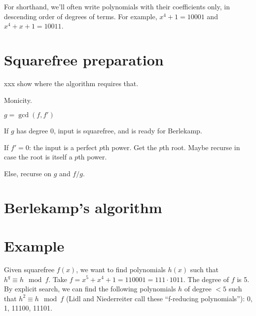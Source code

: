 \documentclass[10pt]{article}
\numberwithin{equation}{subsection}
\begin{document}
For shorthand, we'll often write polynomials with their coefficients only, in
descending order of degrees of terms.  For example, $x^4+1 = 10001$ and
$x^4+x+1=10011$.


\newpage
\section{Squarefree preparation}

xxx show where the algorithm requires that.

Monicity.

$g = \gcd(f,f')$

If $g$ has degree 0, input is squarefree, and is ready for Berlekamp.

If $f' = 0$:  the input is a perfect $p$th power.  Get the $p$th root.
Maybe recurse in case the root is itself a $p$th power.

Else, recurse on $g$ and $f/g$.

\newpage
\section{Berlekamp's algorithm}

\newpage
\section{Example}

Given squarefree $f(x)$, we want to find polynomials $h(x)$
such that $h^q \equiv h \mod f$.  Take $f = x^5+x^4+1 =
110001 = 111 \cdot 1011$.  The degree of $f$ is 5.  By
explicit search, we can find the following polynomials $h$
of degree $< 5$ such that $h^2 \equiv h \mod f$ (Lidl and
Niederreiter call these ``f-reducing polynomials''): 0, 1,
11100, 11101.
\end{document}
